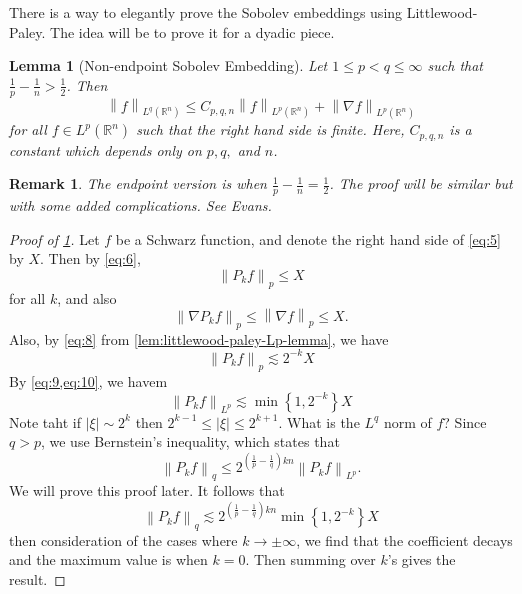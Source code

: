 \documentclass{article}
\newtheorem{lemma}{Lemma}
\newtheorem{remark}{Remark}
\def\R{\mathbb{R}} %
\newcommand\norm[1]{\left\lVert#1\right\rVert}
\begin{document}
There is a way to elegantly prove the Sobolev embeddings using Littlewood-Paley.
The idea will be to prove it for a dyadic piece.
\begin{lemma}[Non-endpoint Sobolev Embedding]
  \label{lem:non-endpoint-sobolev-embedding}
  Let $1 \leq p<q \leq \infty$ such that $\frac{1}{p}-\frac{1}{n}>\frac{1}{2}$.
  Then
  \begin{equation}\label{eq:5}
    \norm{f}_{L^{q}(\R^n)} \leq C_{p,q,n} \norm{f}_{L^{p}(\R^n)} + \norm{\nabla f}_{L^{p}(\R^n)}
  \end{equation}
  for all $f\in L^{p}(\R^n)$ such that the right hand side is finite. Here,
  $C_{p,q,n}$ is a constant which depends only on $p,q,$ and $n$. 
\end{lemma}
\begin{remark}
  The endpoint version is when $\frac{1}{p}-\frac{1}{n}=\frac{1}{2}$.  The proof
  will be similar but with some added complications. See Evans.
\end{remark}
\begin{proof}[Proof of \cref{lem:non-endpoint-sobolev-embedding}]
  Let $f$ be a Schwarz function, and denote the right hand side of \cref{eq:5}
  by $X$. Then by \cref{eq:6},
  \begin{equation}\label{eq:10}
    \norm{P_{k}f}_{p} \leq  X 
  \end{equation}
  for all $k$, and also
  \begin{equation*}
    \norm{\nabla P_{k}f}_{p} \leq \norm{\nabla f}_{p} \leq  X.
  \end{equation*}
  Also, by \cref{eq:8} from \cref{lem:littlewood-paley-Lp-lemma}, we have
  \begin{equation}\label{eq:9}
    \norm{P_{k}f}_{p} \lesssim 2^{-k} X
  \end{equation}
  By \cref{eq:9,eq:10}, we havem
  \begin{equation*}
    \norm{P_{k}f}_{ L^{p}} \lesssim \min \left\{1,2^{-k}\right\}X
  \end{equation*}
  Note taht if $|\xi|\sim 2^{k}$ then $2^{k-1} \leq |\xi| \leq 2^{k+1}$. What is
  the $L^{q}$ norm of $f$? Since $q>p$,  we use Bernstein's inequality, which
  states that
  \begin{equation*}
    \norm{P_{k}f}_{q} \leq 2^{\left( \frac{1}{p}-\frac{1}{q} \right)kn }\norm{P_{k}f}_{L^{p}}.
  \end{equation*}
  We will prove this proof later. It follows that
  \begin{equation*}
    \norm{P_{k}f}_{q} \lesssim 2^{\left( \frac{1}{p}-\frac{1}{q} \right)kn }\min \left\{1,2^{-k}\right\}X
  \end{equation*}
  then consideration of the cases where $k\to \pm \infty$, we find that the
  coefficient decays and the maximum value is when $k=0$. Then summing over
  $k$'s gives the result.
\end{proof}
\end{document}
